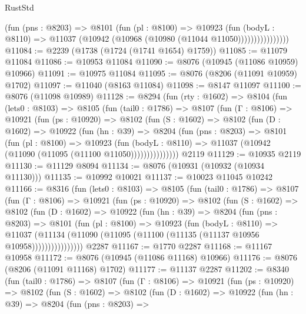 \begin{lexlean}{RustStd}
\begin{coremodule}
                      (fun (pns : @8203) =>
                      @8101
                        (fun (pl : @8100) =>
                        @10923
                          (fun (bodyL : @8110) =>
                          @11037 (@10942 (@10968 (@10980 (@11044 @11050))))))))))))))))
@11084 := @2239 (@1738 (@1724 (@1741 @1654) @1759))
@11085 := @11079 @11084
@11086 := @10953 @11084
@11090 := @8076 (@10945 (@11086 @10959) @10966)
@11091 := @10975 @11084
@11095 := @8076 (@8206 (@11091 @10959) @1702)
@11097 := @11040 (@8163 @11084)
@11098 := @8147 @11097
@11100 := @8076 (@11098 @10989)
@11128 := @8294
    (fun (rty : @1602) =>
    @8104
      (fun (lets0 : @8103) =>
      @8105
        (fun (tail0 : @1786) =>
        @8107
          (fun (Γ : @8106) =>
          @10921
            (fun (ps : @10920) =>
            @8102
              (fun (S : @1602) =>
              @8102
                (fun (D : @1602) =>
                @10922
                  (fun (hn : @39) =>
                  @8204
                    (fun (pns : @8203) =>
                    @8101
                      (fun (pl : @8100) =>
                      @10923
                        (fun (bodyL : @8110) =>
                        @11037 (@10942 (@11090 (@11095 (@11100 @11050)))))))))))))))
    @2119
@11129 := @10935 @2119
@11130 := @11129 @8094
@11134 := @8076 (@10931 (@10932 (@10934 @11130)))
@11135 := @10992 @10021
@11137 := @10023 @11045 @10242
@11166 := @8316
    (fun (lets0 : @8103) =>
    @8105
      (fun (tail0 : @1786) =>
      @8107
        (fun (Γ : @8106) =>
        @10921
          (fun (ps : @10920) =>
          @8102
            (fun (S : @1602) =>
            @8102
              (fun (D : @1602) =>
              @10922
                (fun (hn : @39) =>
                @8204
                  (fun (pns : @8203) =>
                  @8101
                    (fun (pl : @8100) =>
                    @10923
                      (fun (bodyL : @8110) =>
                      @11037
                        (@11134
                          (@11090 (@11095 (@11100 (@11135 (@11137 @10956 @10958))))))))))))))))
    @2287
@11167 := @1770 @2287
@11168 := @11167 @10958
@11172 := @8076 (@10945 (@11086 @11168) @10966)
@11176 := @8076 (@8206 (@11091 @11168) @1702)
@11177 := @11137 @2287
@11202 := @8340
    (fun (tail0 : @1786) =>
    @8107
      (fun (Γ : @8106) =>
      @10921
        (fun (ps : @10920) =>
        @8102
          (fun (S : @1602) =>
          @8102
            (fun (D : @1602) =>
            @10922
              (fun (hn : @39) =>
              @8204
                (fun (pns : @8203) =>

\end{coremodule}
\end{lexlean}
